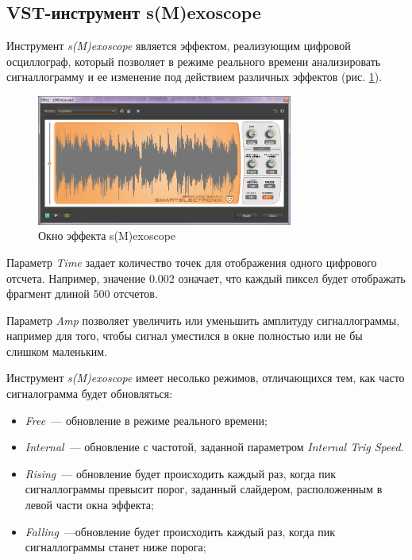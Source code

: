 \documentclass[oneside, final, 14pt]{extreport}
\begin{document}
\subsection{VST-инструмент s(M)exoscope}

Инструмент \textit{s(M)exoscope} является эффектом, реализующим цифровой осциллограф, который позволяет в режиме реального времени анализировать сигналлограмму и ее изменение под действием различных эффектов (рис. \ref{pic-exoscope-01}). 

\begin{figure}[h!]
\centering
\includegraphics[width=0.75\textwidth]{pic-exoscope-01}
\caption{Окно эффекта s(M)exoscope}
\label{pic-exoscope-01}
\end{figure}

Параметр \textit{Time} задает количество точек для отображения одного цифрового отсчета. Например, значение 0.002 означает, что каждый пиксел будет отображать фрагмент длиной 500 отсчетов.

Параметр \textit{Amp} позволяет увеличить или уменьшить амплитуду сигналлограммы, например для того, чтобы сигнал уместился в окне полностью или не бы слишком маленьким.

Инструмент \textit{s(M)exoscope} имеет несолько режимов, отличающихся тем, как часто сигналограмма будет обновляться:
\begin{itemize}
\item \textit{Free}~--- обновление в режиме реального времени;
\item \textit{Internal}~--- обновление с частотой, заданной параметром \textit{Internal Trig Speed}. 
\item \textit{Rising}~--- обновление  будет происходить каждый раз, когда пик сигналлограммы превысит порог, заданный слайдером, расположенным в левой части окна эффекта;
\item \textit{Falling}~---обновление  будет происходить каждый раз, когда пик сигналлограммы станет ниже порога;
\end{itemize}
\end{document}
